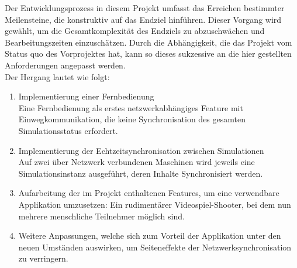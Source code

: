 \label{sec:proceedings}

Der Entwicklungsprozess in diesem Projekt umfasst das Erreichen bestimmter Meilensteine, die konstruktiv auf das Endziel hinführen. Dieser Vorgang wird gewählt, um die Gesamtkomplexität des Endziels zu abzuschwächen und Bearbeitungszeiten einzuschätzen. Durch die Abhängigkeit, die das Projekt vom Status quo des Vorprojektes hat, kann so dieses sukzessive an die hier gestellten Anforderungen angepasst werden.\\
Der Hergang lautet wie folgt:
\begin{enumerate}
\item Implementierung einer Fernbedienung\\
Eine Fernbedienung als erstes netzwerkabhängiges Feature mit Einwegkommunikation, die keine Synchronisation des gesamten Simulationsstatus erfordert.
\item Implementierung der Echtzeitsynchronisation zwischen Simulationen\\
Auf zwei über Netzwerk verbundenen Maschinen wird jeweils eine Simulationsinstanz ausgeführt, deren Inhalte Synchronisiert werden.
\item Aufarbeitung der im Projekt enthaltenen Features, um eine verwendbare Applikation umzusetzen: Ein rudimentärer Videospiel-Shooter, bei dem nun mehrere menschliche Teilnehmer möglich sind.
\item Weitere Anpassungen, welche sich zum Vorteil der Applikation unter den neuen Umständen auswirken, um Seiteneffekte der Netzwerksynchronisation zu verringern.
\end{enumerate}

